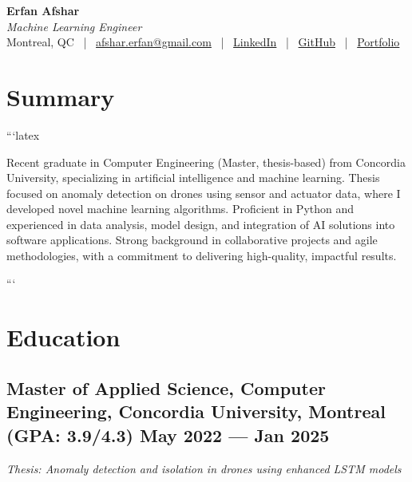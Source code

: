 \documentclass[a4,10pt]{article}
\begin{document}

\begin{center}
    {\Huge \textbf{Erfan Afshar}} \\[0.15cm]
    {\color{UI_blue} \large \textit{Machine Learning Engineer}} \\[0.1cm]
    
    \large
    Montreal, QC \, | \,
    \href{mailto:afshar.erfan@gmail.com}{afshar.erfan@gmail.com} \, | \,
    \href{https://www.linkedin.com/in/erfan-afshar}{LinkedIn} \, | \,
    \href{https://github.com/Erfanafshar}{GitHub} \, | \,
    \href{https://erfanafshar.github.io}{Portfolio} 
\end{center}



\section{Summary}
```latex
\noindent
\begin{minipage}{\textwidth}
Recent graduate in Computer Engineering (Master, thesis-based) from Concordia University, specializing in artificial intelligence and machine learning. Thesis focused on anomaly detection on drones using sensor and actuator data, where I developed novel machine learning algorithms. Proficient in Python and experienced in data analysis, model design, and integration of AI solutions into software applications. Strong background in collaborative projects and agile methodologies, with a commitment to delivering high-quality, impactful results.
\end{minipage}
```
\section{Education}
\subsection*{Master of Applied Science, Computer Engineering, {\normalsize \normalfont Concordia University, Montreal (GPA: 3.9/4.3)} \hfill May 2022 --- Jan 2025} 
\textit{Thesis: Anomaly detection and isolation in drones using enhanced LSTM models}
\end{document}
